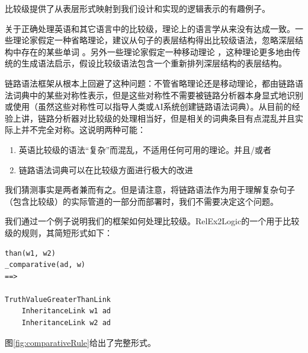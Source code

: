 比较级提供了从表层形式映射到我们设计和实现的逻辑表示的有趣例子。

关于正确处理英语和其它语言中的比较级，理论上的语言学从来没有达成一致。一些理论家假定一种省略理论，建议从句子的表层结构得出比较级语法，忽略深层结构中存在的某些单词\cite{lechner2004ellipsis} \cite{Bhatt2011}。另外一些理论家假定一种移动理论\cite{Margaret2013} \cite{Roumyana1995}，这种理论更多地由传统的生成语法启示，假设比较级语法包含一个重新排列深层结构的表层结构。

链路语法框架从根本上回避了这种问题：不管省略理论还是移动理论，都由链路语法词典中的某些对称性表示，但是这些对称性不需要被链路分析器本身显式地识别或使用（虽然这些对称性可以指导人类或AI系统创建链路语法词典）。从目前的经验上讲，链路分析器对比较级的处理相当好，但是相关的词典条目有点混乱并且实际上并不完全对称。这说明两种可能：

\begin{enumerate}
\item 英语比较级的语法“复杂”而混乱，不适用任何可用的理论。并且/或者
\item 链路语法词典可以在比较级方面进行极大的改进
\end{enumerate}

我们猜测事实是两者兼而有之。但是请注意，将链路语法作为用于理解复杂句子（包含比较级）的实际管道的一部分而部署时，我们不需要决定这个问题。

我们通过一个例子说明我们的框架如何处理比较级。RelEx2Logic的一个用于比较级的规则，其简短形式如下：

 {\tt\begin{small}\begin{lstlisting}
than(w1, w2)
_comparative(ad, w)
==>

TruthValueGreaterThanLink
    InheritanceLink w1 ad
    InheritanceLink w2 ad
\end{lstlisting}\end{small}}

图\ref{fig:comparativeRule}给出了完整形式。

